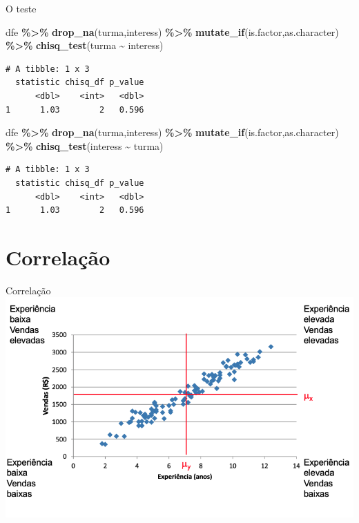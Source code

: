 \documentclass[
  9pt,
  ignorenonframetext,
  aspectratio=169]{beamer}
\newenvironment{Shaded}{\begin{snugshade}}{\end{snugshade}}
\newcommand{\KeywordTok}[1]{\textcolor[rgb]{0.13,0.29,0.53}{\textbf{#1}}}
\newcommand{\NormalTok}[1]{#1}
\newcommand{\OperatorTok}[1]{\textcolor[rgb]{0.81,0.36,0.00}{\textbf{#1}}}
\newcommand{\StringTok}[1]{\textcolor[rgb]{0.31,0.60,0.02}{#1}}
\begin{document}
\begin{frame}[fragile]{O teste}
\protect\hypertarget{o-teste-1}{}
\begin{Shaded}
\begin{Highlighting}[]
\NormalTok{dfe }\OperatorTok{\%\textgreater{}\%}\StringTok{ }\KeywordTok{drop\_na}\NormalTok{(turma,interess) }\OperatorTok{\%\textgreater{}\%}
\StringTok{  }\KeywordTok{mutate\_if}\NormalTok{(is.factor,as.character) }\OperatorTok{\%\textgreater{}\%}\StringTok{ }
\StringTok{  }\KeywordTok{chisq\_test}\NormalTok{(turma }\OperatorTok{\textasciitilde{}}\StringTok{ }\NormalTok{interess) }
\end{Highlighting}
\end{Shaded}

\begin{verbatim}
# A tibble: 1 x 3
  statistic chisq_df p_value
      <dbl>    <int>   <dbl>
1      1.03        2   0.596
\end{verbatim}

\begin{Shaded}
\begin{Highlighting}[]
\NormalTok{dfe }\OperatorTok{\%\textgreater{}\%}\StringTok{ }\KeywordTok{drop\_na}\NormalTok{(turma,interess) }\OperatorTok{\%\textgreater{}\%}
\StringTok{  }\KeywordTok{mutate\_if}\NormalTok{(is.factor,as.character) }\OperatorTok{\%\textgreater{}\%}\StringTok{ }
\StringTok{  }\KeywordTok{chisq\_test}\NormalTok{(interess }\OperatorTok{\textasciitilde{}}\StringTok{ }\NormalTok{turma)}
\end{Highlighting}
\end{Shaded}

\begin{verbatim}
# A tibble: 1 x 3
  statistic chisq_df p_value
      <dbl>    <int>   <dbl>
1      1.03        2   0.596
\end{verbatim}
\end{frame}

\hypertarget{correlauxe7uxe3o}{%
\section{Correlação}\label{correlauxe7uxe3o}}

\begin{frame}{Correlação}
\includegraphics{imgs/corr1.png}
\end{frame}
\end{document}
